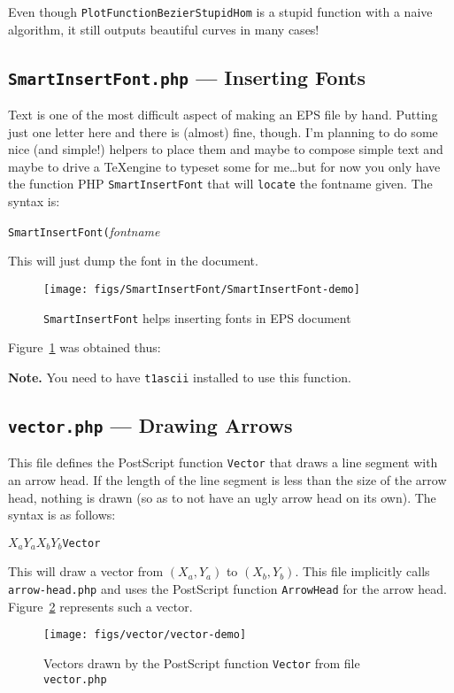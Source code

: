 \documentclass[10pt,a4paper]{scrartcl}
\newcommand\PS{PostScript}
\newenvironment{note}{\par\leavevmode\medskip\textbf{Note.} }{\par\leavevmode\medskip}
\begin{document}
Even though \texttt{PlotFunctionBezierStupidHom} is a stupid function with a
naive algorithm, it still outputs beautiful curves in many cases!

\subsection{\texttt{SmartInsertFont.php} --- Inserting Fonts}
\label{ssec:SmartInsertFont.php}
Text is one of the most difficult aspect of making an EPS file by hand. Putting
just one letter here and there is (almost) fine, though. I'm planning to do
some nice (and simple!) helpers to place them and maybe to compose simple text
and maybe to drive a \TeX engine to typeset some for me\ldots but for now you
only have the function PHP \texttt{SmartInsertFont} that will \texttt{locate}
the fontname given. The syntax is:
\begin{center}
\texttt{SmartInsertFont\quad(}\quad\textit{fontname}\quad{)}
\end{center}
This will just dump the font in the document.
\begin{figure}[ht!]%
\centering
\texttt{[image: figs/SmartInsertFont/SmartInsertFont-demo]}%
\caption{\texttt{SmartInsertFont} helps inserting fonts in EPS document}%
\label{fig:SmartInsertFont-demo.php}%
\end{figure}

Figure~\ref{fig:SmartInsertFont-demo.php} was obtained thus:


\begin{note}
You need to have \texttt{t1ascii} installed to use this function.
\end{note}

\subsection{\texttt{vector.php} --- Drawing Arrows}
\label{ssec:vector.php}
This file defines the \PS{} function \texttt{Vector} that draws a line segment
with an arrow head. If the length of the line segment is less than the size
of the arrow head, nothing is drawn (so as to not have an ugly arrow head on its own).
The syntax is as follows:
\begin{center}
$X_a$\quad$Y_a$\quad$X_b$\quad$Y_b$\quad\texttt{Vector}
\end{center}
This will draw a vector from $(X_a,Y_a)$ to $(X_b,Y_b)$. This file implicitly calls
\texttt{arrow-head.php} and uses the \PS{} function \texttt{ArrowHead} for the arrow head.
Figure~\ref{fig:vector-demo} represents such a vector.
\begin{figure}[ht!]%
\centering
\texttt{[image: figs/vector/vector-demo]}%
\caption{Vectors drawn by the \PS{} function \texttt{Vector} from file \texttt{vector.php}}%
\label{fig:vector-demo}%
\end{figure}
\end{document}
